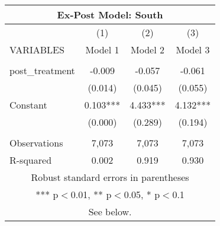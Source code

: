 \begin{tabular}{lccc}
\multicolumn{4}{c}{Ex-Post Model: South} \\ \hline
 & (1) & (2) & (3) \\
VARIABLES & Model 1 & Model 2 & Model 3 \\ \hline
 &  &  &  \\
post\_treatment & -0.009 & -0.057 & -0.061 \\
 & (0.014) & (0.045) & (0.055) \\
Constant & 0.103*** & 4.433*** & 4.132*** \\
 & (0.000) & (0.289) & (0.194) \\
 &  &  &  \\
Observations & 7,073 & 7,073 & 7,073 \\
 R-squared & 0.002 & 0.919 & 0.930 \\ \hline
\multicolumn{4}{c}{ Robust standard errors in parentheses} \\
\multicolumn{4}{c}{ *** p$<$0.01, ** p$<$0.05, * p$<$0.1} \\
\multicolumn{4}{c}{ See below.} \\
\end{tabular}
